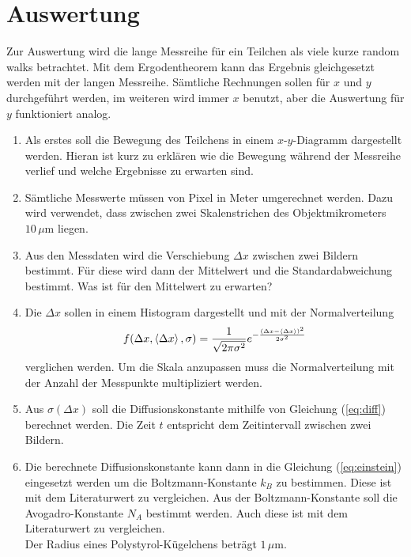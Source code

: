 \section*{Auswertung}

Zur Auswertung wird die lange Messreihe für ein Teilchen als viele kurze random walks betrachtet. Mit dem Ergodentheorem kann das Ergebnis gleichgesetzt werden mit der langen Messreihe.
Sämtliche Rechnungen sollen für $x$ und $y$ durchgeführt werden, im weiteren wird immer $x$ benutzt, aber die Auswertung für $y$ funktioniert analog.

\begin{enumerate}
\item Als erstes soll die Bewegung des Teilchens in einem $x$-$y$-Diagramm dargestellt werden. Hieran ist kurz zu erklären wie die Bewegung während der Messreihe verlief und welche Ergebnisse zu erwarten sind.

\item Sämtliche Messwerte müssen von Pixel in Meter umgerechnet werden. Dazu wird verwendet, dass zwischen zwei Skalenstrichen des Objektmikrometers $10\, \mu$m liegen.

\item Aus den Messdaten wird die Verschiebung $\Delta x$ zwischen zwei Bildern bestimmt. Für diese wird dann der Mittelwert und die Standardabweichung bestimmt. Was ist für den Mittelwert zu erwarten?

\item Die $\Delta x$ sollen in einem Histogram dargestellt und mit der Normalverteilung
\begin{equation}
  f(\Delta x, \left< \Delta x \right>, \sigma) = \frac{1}{\sqrt{2 \pi \sigma^2}} e^{- \frac{(\Delta x - \left< \Delta x \right>)^2}{2 \sigma^2}}
\end{equation}
verglichen werden. Um die Skala anzupassen muss die Normalverteilung mit der Anzahl der Messpunkte multipliziert werden.

\item Aus $\sigma(\Delta x)$ soll die Diffusionskonstante mithilfe von Gleichung (\ref{eq:diff}) berechnet werden. Die Zeit $t$ entspricht dem Zeitintervall zwischen zwei Bildern.

\item Die berechnete Diffusionskonstante kann dann in die Gleichung (\ref{eq:einstein}) eingesetzt werden um die Boltzmann-Konstante $k_B$ zu bestimmen. Diese ist mit dem Literaturwert zu vergleichen. Aus der Boltzmann-Konstante soll die Avogadro-Konstante $N_A$ bestimmt werden. Auch diese ist mit dem Literaturwert zu vergleichen.\\
Der Radius eines Polystyrol-Kügelchens beträgt $1\,\mu$m.
\end{enumerate}


